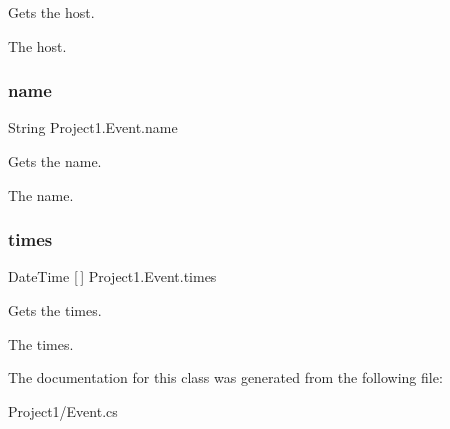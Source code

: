 Gets the host. 

The host. \mbox{\label{class_project1_1_1_event_a04f15bb124d4410eece35779864589bf}} 
\subsubsection{\texorpdfstring{name}{name}}
{\footnotesize\ttfamily String Project1.\+Event.\+name\hspace{0.3cm}{\ttfamily [get]}}



Gets the name. 

The name. \mbox{\label{class_project1_1_1_event_acc6d286c687a5ac9256a146d99de1cb6}} 
\subsubsection{\texorpdfstring{times}{times}}
{\footnotesize\ttfamily Date\+Time \mbox{[}$\,$\mbox{]} Project1.\+Event.\+times\hspace{0.3cm}{\ttfamily [get]}}



Gets the times. 

The times. 

The documentation for this class was generated from the following file\+:\begin{DoxyCompactItemize}
\item 
Project1/Event.\+cs\end{DoxyCompactItemize}
